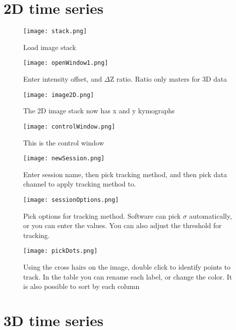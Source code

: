 
\section{2D time series}
\begin{figure}[h]
\centering
	\texttt{[image: stack.png]}
	\caption{Load image stack}
	\label{stack}
\end{figure}

\begin{figure}[h]
\centering
	\texttt{[image: openWindow1.png]}
	\caption{Enter intensity offset, and $\Delta$Z ratio. Ratio only maters for 3D data}
	\label{window1}
\end{figure}

\begin{figure}[h]
\centering
	\texttt{[image: image2D.png]}
	\caption{The 2D image stack now has x and y kymographs}
	\label{image2D}
\end{figure}

\begin{figure}[h]
\centering
	\texttt{[image: controlWindow.png]}
	\caption{This is the control window}
	\label{controlWindow}
\end{figure}

\begin{figure}[h]
\centering
	\texttt{[image: newSession.png]}
	\caption{Enter session name, then pick tracking method, and then pick data channel to apply tracking method to.}
	\label{newSession}
\end{figure}


\begin{figure}[h]
\centering
	\texttt{[image: sessionOptions.png]}
	\caption{Pick options for tracking method. Software can pick $\sigma$ automatically, or you can enter the values.  You can also adjust the threshold for tracking. }
	\label{sessionOptions}
\end{figure}

\begin{figure}[h]
\centering
	\texttt{[image: pickDots.png]}
	\caption{Using the cross hairs on the image, double click to identify points to track. In the table you can rename each label, or change the color.  It is also possible to sort by each column }
	\label{pickDots}
\end{figure}


\section{3D time series}